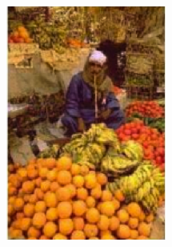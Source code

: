 \documentclass[10pt,twocolumn,letterpaper]{article}
\begin{document}
\begin{figure}[h]
  \centering
  \begin{subfigure}{0.23\textwidth}
    \includegraphics[width=\textwidth]{fruits1.png}
    \caption{}
  \end{subfigure}
  \begin{subfigure}{0.23\textwidth}

\end{subfigure}
\end{figure}
\end{document}
